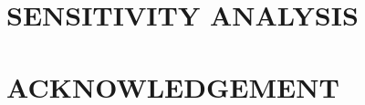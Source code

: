 \documentclass[11pt]{witseiepaper}
\begin{document}
\section{SENSITIVITY ANALYSIS}

\section*{ACKNOWLEDGEMENT} \label{sec:ACKNOWLEDGEMENT}


%




\end{document}
